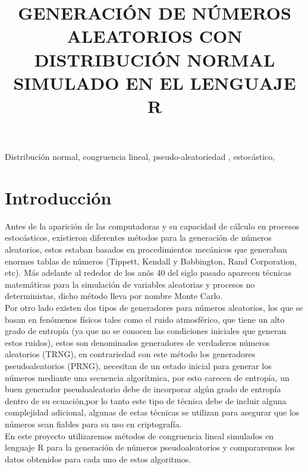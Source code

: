 \documentclass[conference]{IEEEtran}
\begin{document}
	
\title{GENERACI\'ON DE N\'UMEROS ALEATORIOS CON DISTRIBUCI\'ON NORMAL SIMULADO EN EL LENGUAJE R}
\author{
}
\maketitle
	
\begin{abstract}

\end{abstract}
\begin{IEEEkeywords}
Distribuci\'on normal, congruencia lineal, pseudo-aleatoriedad , estoc\'astico, 
\end{IEEEkeywords}

\section{\textbf{Introducci\'on}}
Antes de la aparici\'on de las computadoras y su capacidad de c\'alculo en procesos estoc\'asticos, existieron diferentes m\'etodos para la generaci\'on de n\'umeros aleatorios, estos estaban basados en procedimientos mec\'anicos que generaban enormes tablas de n\'umeros (Tippett, Kendall y Babbington, Rand Corporation, etc). M\'as adelante al rededor de los an\~os 40 del siglo pasado aparecen t\'ecnicas matem\'aticas para la simulaci\'on de variables aleatorias y procesos no deterministas, dicho m\'etodo lleva por nombre Monte Carlo.\\
Por otro lado existen dos tipos de generadores para n\'umeros aleatorios, los que se basan en fen\'omenos f\'isicos tales como el ruido atmosf\'erico, que tiene un alto grado de entrop\'ia (ya que no se conocen las condiciones iniciales que generan estos ruidos), estos son denominados generadores de verdaderos n\'umeros aleatorios (TRNG), en contrariedad con este m\'etodo los generadores pseudoaleatorios (PRNG), necesitan de un estado inicial para generar los n\'umeros mediante una secuencia algor\'itmica, por esto carecen de entrop\'ia, un buen generador pseudoaleatorio debe de incorporar alg\'un grado de entrop\'ia dentro de su ecuaci\'on,por lo tanto este tipo de t\'ecnica debe de incluir alguna complejidad adicional, algunas de estas t\'ecnicas se utilizan para asegurar que los n\'umeros sean fiables para su uso en criptograf\'ia.\\
En este proyecto utilizaremos m\'etodos de congruencia lineal simulados en lenguaje R para la generaci\'on de n\'umeros pseudoaleatorios y compararemos los datos obtenidos para cada uno de estos algoritmos.
\end{document}

